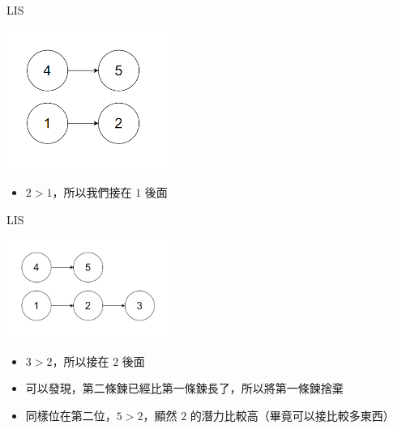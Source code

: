 \documentclass[aspectratio=169]{beamer}
\begin{document}
    \begin{frame}{LIS}
        \begin{center}
            \includegraphics[width=0.4\textwidth]{img/LIS-3.png}
        \end{center}

        \begin{itemize}
            \item $2 > 1$，所以我們接在 $1$ 後面
        \end{itemize}
    \end{frame}

    \begin{frame}{LIS}
        \begin{center}
            \includegraphics[width=0.4\textwidth]{img/LIS-4.png}
        \end{center}

        \begin{itemize}
            \item $3 > 2$，所以接在 $2$ 後面
            \item 可以發現，第二條鍊已經比第一條鍊長了，所以將第一條鍊捨棄
            \item 同樣位在第二位，$5 > 2$，顯然 $2$ 的潛力比較高（畢竟可以接比較多東西）
        \end{itemize}
    \end{frame}
\end{document}
